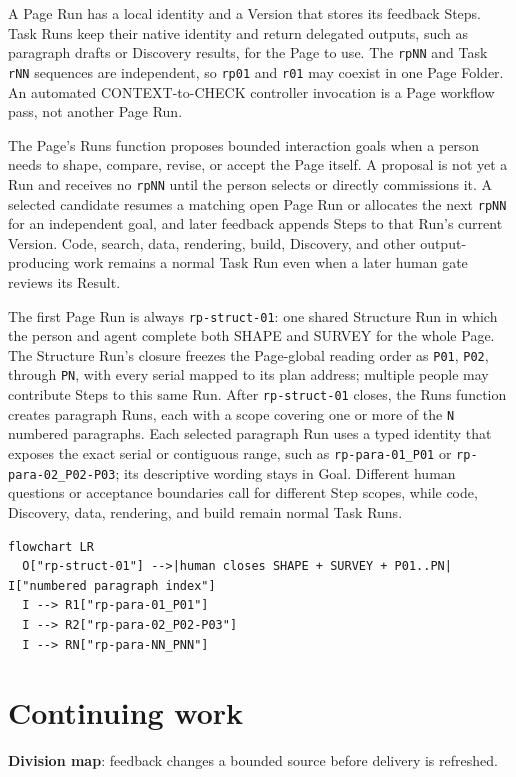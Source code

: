A Page Run has a local identity and a Version that stores its feedback Steps. Task Runs keep their native identity and return delegated outputs, such as paragraph drafts or Discovery results, for the Page to use. The \texttt{rpNN} and Task \texttt{rNN} sequences are independent, so \texttt{rp01} and \texttt{r01} may coexist in one Page Folder. An automated CONTEXT-to-CHECK controller invocation is a Page workflow pass, not another Page Run.

The Page's Runs function proposes bounded interaction goals when a person needs to shape, compare, revise, or accept the Page itself. A proposal is not yet a Run and receives no \texttt{rpNN} until the person selects or directly commissions it. A selected candidate resumes a matching open Page Run or allocates the next \texttt{rpNN} for an independent goal, and later feedback appends Steps to that Run's current Version. Code, search, data, rendering, build, Discovery, and other output-producing work remains a normal Task Run even when a later human gate reviews its Result.

The first Page Run is always \texttt{rp-struct-01}: one shared Structure Run in which the person and agent complete both SHAPE and SURVEY for the whole Page. The Structure Run's closure freezes the Page-global reading order as \texttt{P01}, \texttt{P02}, through \texttt{PN}, with every serial mapped to its plan address; multiple people may contribute Steps to this same Run. After \texttt{rp-struct-01} closes, the Runs function creates paragraph Runs, each with a scope covering one or more of the \texttt{N} numbered paragraphs. Each selected paragraph Run uses a typed identity that exposes the exact serial or contiguous range, such as \texttt{rp-para-01\_P01} or \texttt{rp-para-02\_P02-P03}; its descriptive wording stays in Goal. Different human questions or acceptance boundaries call for different Step scopes, while code, Discovery, data, rendering, and build remain normal Task Runs.

\begin{verbatim}
flowchart LR
  O["rp-struct-01"] -->|human closes SHAPE + SURVEY + P01..PN| I["numbered paragraph index"]
  I --> R1["rp-para-01_P01"]
  I --> R2["rp-para-02_P02-P03"]
  I --> RN["rp-para-NN_PNN"]
\end{verbatim}

\section{Continuing work}
\textbf{Division map}: feedback changes a bounded source before delivery is refreshed.

